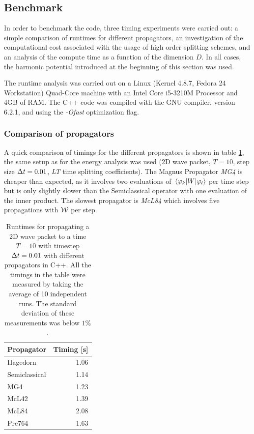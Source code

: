\subsection{Benchmark}
\label{subsec:benchmark}
%
In order to benchmark the code, three timing experiments were carried out: a simple comparison of runtimes for different propagators, an investigation of the computational cost associated with the usage of high order splitting schemes, and an analysis of the compute time as a function of the dimension $D$.
In all cases, the harmonic potential introduced at the beginning of this section was used.
\par\medskip
%
The runtime analysis was carried out on a Linux (Kernel 4.8.7, Fedora 24 Workstation) Quad-Core machine with an Intel Core i5-3210M Processor and
4GB of RAM. The C++ code was compiled with the GNU compiler, version 6.2.1, and using the \emph{-Ofast} optimization flag.




\subsubsection{Comparison of propagators}
%
A quick comparison of timings for the different propagators is shown in table \ref{tab:speedup}, the same setup as for the energy analysis was used (2D wave packet, $T = 10$, step size $\Delta t = 0.01$, \emph{LT} time splitting coefficients).
The Magnus Propagator \emph{MG4} is cheaper than expected, as it involves two evaluations of $\matrixel{\varphi_k}{W}{\varphi_l}$ per time step but is only slightly slower than the Semiclassical operator with one evaluation of the inner product.
The slowest propagator is \emph{McL84} which involves five propagations with $\mathcal{W}$ per step.
%
\begin{table}[ht]
	\centering
	\begin{tabular}{|l | r |} 
		\hline
		\multicolumn{1}{|c}{\textbf{Propagator}} &
		\multicolumn{1}{|c|}{\textbf{Timing [s]}} \\
		\hline
		Hagedorn & 1.06 \\
		Semiclassical & 1.14 \\
		MG4 & 1.23 \\
		McL42 & 1.39 \\
		McL84 & 2.08 \\
		Pre764 & 1.63 \\
		\hline
	\end{tabular}
	\caption{Runtimes for propagating a 2D wave packet to a time $T = 10$ with timestep $\Delta t = 0.01$ with different propagators in C++. All the timings in the table were measured by taking the average of 10 independent runs. The standard deviation of these measurements was below $1\%$.}
	\label{tab:speedup}
\end{table}


